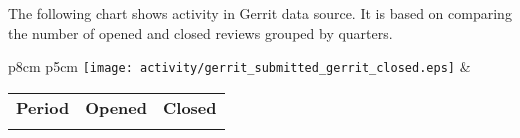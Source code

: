 The following chart shows activity in Gerrit data source. It is based on comparing the number of opened and closed reviews grouped by quarters.

\begin{tabular}{p{8cm} p{5cm}}
	\vspace{0pt} 
	\hspace*{-5cm}  
	\texttt{[image: activity/gerrit\_submitted\_gerrit\_closed.eps]}
	& 
	\vspace{0pt}
	\begin{tabular}{l|r|r|}%
		\bfseries Period & \bfseries Opened & \bfseries Closed %
		\csvreader[head to column names]{activity/gerrit_submitted_gerrit_closed.csv}{}%
		{\\\Date & \submitted & \closed}
	\end{tabular}
\end{tabular}